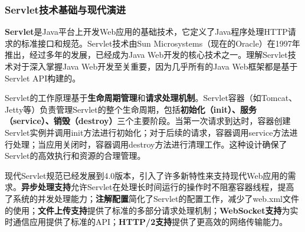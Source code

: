 \subsubsection{Servlet技术基础与现代演进}\label{servletux6280ux672fux57faux7840ux4e0eux73b0ux4ee3ux6f14ux8fdb}

\textbf{Servlet}是Java平台上开发Web应用的基础技术，它定义了Java程序处理HTTP请求的标准接口和规范。Servlet技术由Sun Microsystems（现在的Oracle）在1997年推出，经过多年的发展，已经成为Java Web开发的核心技术之一。理解Servlet技术对于深入掌握Java Web开发至关重要，因为几乎所有的Java Web框架都是基于Servlet API构建的。

Servlet的工作原理基于\textbf{生命周期管理}和\textbf{请求处理机制}。Servlet容器（如Tomcat、Jetty等）负责管理Servlet的整个生命周期，包括\textbf{初始化（init）、服务（service）、销毁（destroy）}三个主要阶段。当第一次请求到达时，容器创建Servlet实例并调用init方法进行初始化；对于后续的请求，容器调用service方法进行处理；当应用关闭时，容器调用destroy方法进行清理工作。这种设计确保了Servlet的高效执行和资源的合理管理。

现代Servlet规范已经发展到4.0版本，引入了许多新特性来支持现代Web应用的需求。\textbf{异步处理支持}允许Servlet在处理长时间运行的操作时不阻塞容器线程，提高了系统的并发处理能力；\textbf{注解配置}简化了Servlet的配置工作，减少了web.xml文件的使用；\textbf{文件上传支持}提供了标准的多部分请求处理机制；\textbf{WebSocket支持}为实时通信应用提供了标准的API；\textbf{HTTP/2支持}提供了更高效的网络传输能力。

